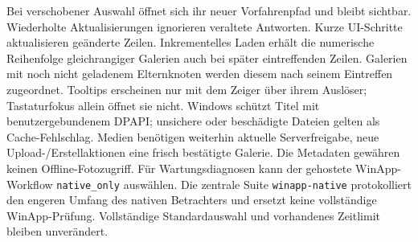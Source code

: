 \documentclass[11pt,a4paper]{article}
\begin{document}
Bei verschobener Auswahl öffnet sich ihr neuer Vorfahrenpfad und bleibt sichtbar.
Wiederholte Aktualisierungen ignorieren veraltete Antworten. Kurze UI-Schritte
aktualisieren geänderte Zeilen. Inkrementelles Laden erhält die numerische
Reihenfolge gleichrangiger Galerien auch bei später eintreffenden Zeilen.
Galerien mit noch nicht geladenem Elternknoten werden diesem nach seinem
Eintreffen zugeordnet. Tooltips erscheinen nur mit dem Zeiger über ihrem
Auslöser; Tastaturfokus allein öffnet sie nicht. Windows schützt Titel
mit benutzergebundenem
DPAPI; unsichere oder beschädigte Dateien gelten als Cache-Fehlschlag. Medien
benötigen weiterhin aktuelle Serverfreigabe, neue Upload-/Erstellaktionen eine
frisch bestätigte Galerie. Die Metadaten gewähren keinen Offline-Fotozugriff.
Für Wartungsdiagnosen kann der gehostete WinApp-Workflow
\texttt{native\_only} auswählen. Die zentrale Suite \texttt{winapp-native}
protokolliert den engeren Umfang des nativen Betrachters und ersetzt keine
vollständige WinApp-Prüfung. Vollständige Standardauswahl und vorhandenes
Zeitlimit bleiben unverändert.
\end{document}
